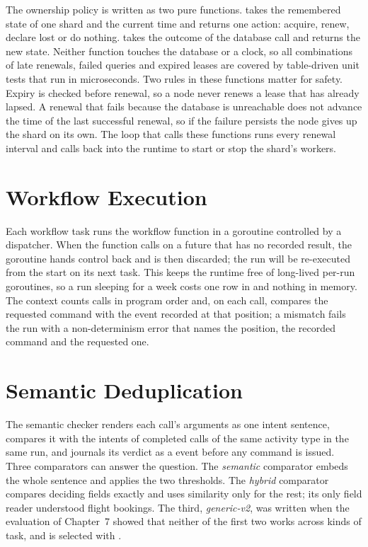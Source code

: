 The ownership policy is written as two pure functions.  takes the
remembered state of one shard and the current time and returns one action:
acquire, renew, declare lost or do nothing.  takes the outcome of
the database call and returns the new state. Neither function touches the
database or a clock, so all combinations of late renewals, failed queries and
expired leases are covered by table-driven unit tests that run in
microseconds. Two rules in these functions matter for safety. Expiry is
checked before renewal, so a node never renews a lease that has already
lapsed. A renewal that fails because the database is unreachable does not
advance the time of the last successful renewal, so if the failure persists
the node gives up the shard on its own. The loop that calls these functions
runs every renewal interval and calls back into the runtime to start or stop
the shard's workers.

\section{Workflow Execution}

Each workflow task runs the workflow function in a goroutine controlled by a
dispatcher. When the function calls  on a future that has no recorded
result, the goroutine hands control back and is then discarded; the run will
be re-executed from the start on its next task. This keeps the runtime free of
long-lived per-run goroutines, so a run sleeping for a week costs one row in
 and nothing in memory. The context counts calls in program order
and, on each call, compares the requested command with the event recorded at
that position; a mismatch fails the run with a non-determinism error that
names the position, the recorded command and the requested one.

\section{Semantic Deduplication}

The semantic checker renders each call's arguments as one intent sentence,
compares it with the intents of completed calls of the same activity type in
the same run, and journals its verdict as a 
event before any command is issued. Three comparators can answer the
question. The \emph{semantic} comparator embeds the whole sentence and
applies the two thresholds. The \emph{hybrid} comparator compares deciding
fields exactly and uses similarity only for the rest; its only field reader
understood flight bookings. The third, \emph{generic-v2}, was written when
the evaluation of Chapter~7 showed that neither of the first two works
across kinds of task, and is selected with .

